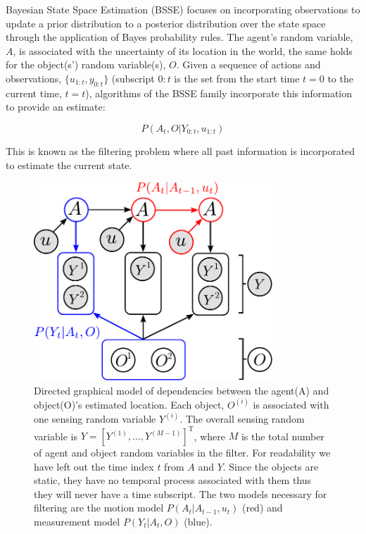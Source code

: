 Bayesian State Space Estimation (BSSE) focuses on incorporating observations to update a prior distribution to a posterior distribution 
over the state space through the application of Bayes probability rules. The agent's random variable, $A$, 
is associated with the uncertainty of its location in the world, the same holds for the object(s') random variable(s), $O$. 
Given a sequence of actions and observations, $\{u_{1:t},y_{0:t}\}$ (subscript $0:t$ is the set from the start time $t=0$ to the current time, $t=t$), 
algorithms of the BSSE family incorporate this information to provide an estimate:

\begin{equation}
 P(A_t,O|Y_{0:t},u_{1:t}) 
 \label{eq:joint}
\end{equation}

This is known as the filtering problem where all past information is incorporated to estimate the current state.  

\begin{figure}
\centering
\includegraphics[width=0.8\textwidth]{./ch5-MLMF/Figures/Figure2.pdf}
\caption{Directed graphical model of dependencies between the agent(A) and object(O)'s estimated location. Each 
object, $O^{(i)}$ is associated with one sensing random variable $Y^{(i)}$. The overall sensing random variable is $Y = \left[Y^{(1)},\dots,Y^{(M-1)}\right]^{\mathrm{T}}$,
where $M$ is the total number of agent and object random variables in the filter. 
For readability we have left out the time index $t$ from $A$ and $Y$. Since the objects are static, they have no temporal process associated with 
them thus they will never have a time subscript. The two models necessary for filtering are the motion model $P(A_t|A_{t-1},u_t)$ (red) and measurement model
$P(Y_t|A_t,O)$ (blue).}
\label{fig:bayesian_sse_dag}
\end{figure}

